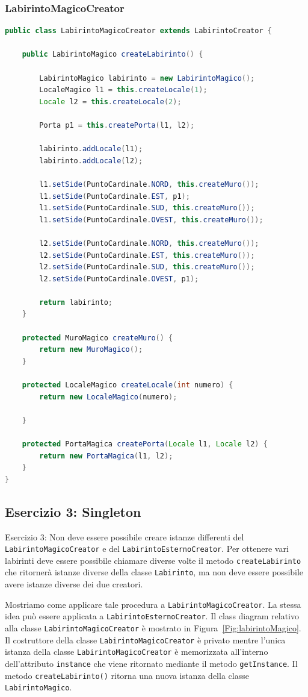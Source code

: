 \documentclass{article}
\begin{document}
\subsubsection{LabirintoMagicoCreator}
\begin{lstlisting}[language=Java]
public class LabirintoMagicoCreator extends LabirintoCreator {

	public LabirintoMagico createLabirinto() {

		LabirintoMagico labirinto = new LabirintoMagico();
		LocaleMagico l1 = this.createLocale(1);
		Locale l2 = this.createLocale(2);

		Porta p1 = this.createPorta(l1, l2);

		labirinto.addLocale(l1);
		labirinto.addLocale(l2);

		l1.setSide(PuntoCardinale.NORD, this.createMuro());
		l1.setSide(PuntoCardinale.EST, p1);
		l1.setSide(PuntoCardinale.SUD, this.createMuro());
		l1.setSide(PuntoCardinale.OVEST, this.createMuro());

		l2.setSide(PuntoCardinale.NORD, this.createMuro());
		l2.setSide(PuntoCardinale.EST, this.createMuro());
		l2.setSide(PuntoCardinale.SUD, this.createMuro());
		l2.setSide(PuntoCardinale.OVEST, p1);

		return labirinto;
	}

	protected MuroMagico createMuro() {
		return new MuroMagico();
	}

	protected LocaleMagico createLocale(int numero) {
		return new LocaleMagico(numero);

	}

	protected PortaMagica createPorta(Locale l1, Locale l2) {
		return new PortaMagica(l1, l2);
	}
}
\end{lstlisting}


\subsection{Esercizio 3: Singleton}
\begin{framed}
Esercizio 3: Non deve essere possibile creare istanze differenti del \texttt{LabirintoMagicoCreator} e del \texttt{LabirintoEsternoCreator}. Per ottenere vari labirinti deve essere possibile chiamare diverse volte il metodo \texttt{createLabirinto} che ritorner\`a istanze diverse della classe \texttt{Labirinto}, ma non deve essere possibile avere istanze diverse dei due creatori.
\end{framed}

Mostriamo come applicare tale procedura a \texttt{LabirintoMagicoCreator}. La stessa idea pu\`o essere applicata a \texttt{LabirintoEsternoCreator}. Il class diagram relativo alla classe  \texttt{LabirintoMagicoCreator} \`e mostrato in Figura~\ref{Fig:labirintoMagico}. Il costruttore della classe  \texttt{LabirintoMagicoCreator}  \`e privato mentre l'unica istanza della classe \texttt{LabirintoMagicoCreator} \`e memorizzata all'interno dell'attributo \texttt{instance} che viene ritornato mediante il metodo \texttt{getInstance}. Il metodo \texttt{createLabirinto()} ritorna una nuova istanza della classe \texttt{LabirintoMagico}.
\end{document}
